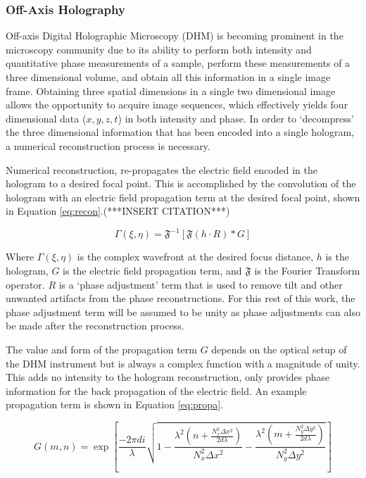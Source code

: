 \documentclass[10pt,letterpaper]{article}
\begin{document}
 \subsubsection{Off-Axis Holography}
 
 Off-axis Digital Holographic Microscopy (DHM) is becoming prominent in the microscopy community due to its ability to perform both intensity and quantitative phase measurements of a sample, perform these measurements of a three dimensional volume, and obtain all this information in a single image frame. Obtaining three spatial dimensions in a single two dimensional image allows the opportunity to acquire image sequences, which effectively yields four dimensional data ($x,y,z,t$) in both intensity and phase. In order to `decompress' the three dimensional information that has been encoded into a single hologram, a numerical reconstruction process is necessary.
 
 Numerical reconstruction, re-propagates the electric field encoded in the hologram to a desired focal point. This is accomplished by the convolution of the hologram with an electric field propagation term at the desired focal point, shown in Equation \ref{eq:recon}.(***INSERT CITATION***)
 
 \begin{equation}
 \Gamma(\xi,\eta)=\mathfrak{F}^{-1}[\mathfrak{F}(h\cdot R)*G]
 \label{eq:recon}
 \end{equation}
 
 Where $\Gamma(\xi,\eta)$ is the complex wavefront at the desired focus distance, $h$ is the hologram, $G$ is the electric field propagation term, and $\mathfrak{F}$ is the Fourier Transform operator. $R$ is a `phase adjustment' term that is used to remove tilt and other unwanted artifacts from the phase reconstructions. For this rest of this work, the phase adjustment term will be assumed to be unity as phase adjustments can also be made after the reconstruction process.
 
  The value and form of the propagation term $G$ depends on the optical setup of the DHM instrument but is always a complex function with a magnitude of unity. This adds no intensity to the hologram reconstruction, only provides phase information for the back propagation of the electric field. An example propagation term is shown in Equation \ref{eq:propa}.
 
 \begin{equation}
 G(m,n)=\exp\left[\frac{-2\pi di}{\lambda}\sqrt{1-\frac{\lambda^2\left(n+\frac{N_x^2\Delta x^2}{2d\lambda}\right)}{N_x^2\Delta x^2} - \frac{\lambda^2\left(m+\frac{N_y^2\Delta y^2}{2d\lambda}\right)}{N_y^2\Delta y^2}  }\right]
 \label{eq:propa}
 \end{equation}
 
\end{document}

